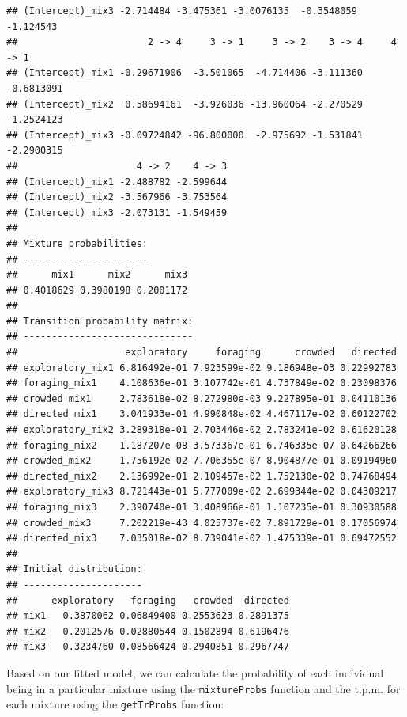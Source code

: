 \documentclass[12pt]{article}\usepackage[]{graphicx}\usepackage[]{xcolor}
\makeatletter
\newenvironment{kframe}{%
 \def\at@end@of@kframe{}%
 \ifinner\ifhmode%
  \def\at@end@of@kframe{\end{minipage}}%
  \begin{minipage}{\columnwidth}%
 \fi\fi%
 \def\FrameCommand##1{\hskip\@totalleftmargin \hskip-\fboxsep
 \colorbox{shadecolor}{##1}\hskip-\fboxsep
     \hskip-\linewidth \hskip-\@totalleftmargin \hskip\columnwidth}%
 \MakeFramed {\advance\hsize-\width
   \@totalleftmargin\z@ \linewidth\hsize
   \@setminipage}}%
 {\par\unskip\endMakeFramed%
 \at@end@of@kframe}
\newenvironment{knitrout}{}{} %
\makeatother
\begin{document}
\begin{knitrout}
\begin{kframe}
\begin{verbatim}
## (Intercept)_mix3 -2.714484 -3.475361 -3.0076135  -0.3548059  -1.124543
##                       2 -> 4     3 -> 1     3 -> 2    3 -> 4     4 -> 1
## (Intercept)_mix1 -0.29671906  -3.501065  -4.714406 -3.111360 -0.6813091
## (Intercept)_mix2  0.58694161  -3.926036 -13.960064 -2.270529 -1.2524123
## (Intercept)_mix3 -0.09724842 -96.800000  -2.975692 -1.531841 -2.2900315
##                     4 -> 2    4 -> 3
## (Intercept)_mix1 -2.488782 -2.599644
## (Intercept)_mix2 -3.567966 -3.753564
## (Intercept)_mix3 -2.073131 -1.549459
## 
## Mixture probabilities:
## ----------------------
##      mix1      mix2      mix3 
## 0.4018629 0.3980198 0.2001172 
## 
## Transition probability matrix:
## ------------------------------
##                   exploratory     foraging      crowded   directed
## exploratory_mix1 6.816492e-01 7.923599e-02 9.186948e-03 0.22992783
## foraging_mix1    4.108636e-01 3.107742e-01 4.737849e-02 0.23098376
## crowded_mix1     2.783618e-02 8.272980e-03 9.227895e-01 0.04110136
## directed_mix1    3.041933e-01 4.990848e-02 4.467117e-02 0.60122702
## exploratory_mix2 3.289318e-01 2.703446e-02 2.783241e-02 0.61620128
## foraging_mix2    1.187207e-08 3.573367e-01 6.746335e-07 0.64266266
## crowded_mix2     1.756192e-02 7.706355e-07 8.904877e-01 0.09194960
## directed_mix2    2.136992e-01 2.109457e-02 1.752130e-02 0.74768494
## exploratory_mix3 8.721443e-01 5.777009e-02 2.699344e-02 0.04309217
## foraging_mix3    2.390740e-01 3.408966e-01 1.107235e-01 0.30930588
## crowded_mix3     7.202219e-43 4.025737e-02 7.891729e-01 0.17056974
## directed_mix3    7.035018e-02 8.739041e-02 1.475339e-01 0.69472552
## 
## Initial distribution:
## ---------------------
##      exploratory   foraging   crowded  directed
## mix1   0.3870062 0.06849400 0.2553623 0.2891375
## mix2   0.2012576 0.02880544 0.1502894 0.6196476
## mix3   0.3234760 0.08566424 0.2940851 0.2967747
\end{verbatim}
\end{kframe}
\end{knitrout}
\noindent Based on our fitted model, we can calculate the probability of each individual being in a particular mixture using the \verb|mixtureProbs| function and the t.p.m. for each mixture using the \verb|getTrProbs| function:
\end{document}
